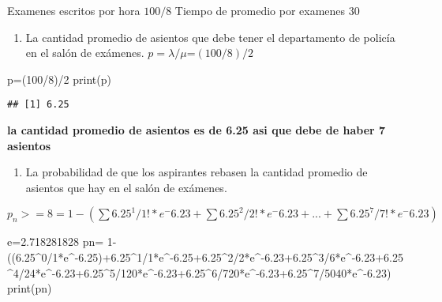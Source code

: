 \documentclass[
]{article}
\newenvironment{Shaded}{\begin{snugshade}}{\end{snugshade}}
\newcommand{\DecValTok}[1]{\textcolor[rgb]{0.00,0.00,0.81}{#1}}
\newcommand{\FloatTok}[1]{\textcolor[rgb]{0.00,0.00,0.81}{#1}}
\newcommand{\FunctionTok}[1]{\textcolor[rgb]{0.00,0.00,0.00}{#1}}
\newcommand{\NormalTok}[1]{#1}
\newcommand{\OtherTok}[1]{\textcolor[rgb]{0.56,0.35,0.01}{#1}}
\newcommand{\SpecialCharTok}[1]{\textcolor[rgb]{0.00,0.00,0.00}{#1}}
\providecommand{\tightlist}{%
  \setlength{\itemsep}{0pt}\setlength{\parskip}{0pt}}
\begin{document}
Examenes escritos por hora \(100/8\) Tiempo de promedio por examenes
\(30\)

\begin{enumerate}
\def\labelenumi{\alph{enumi})}
\tightlist
\item
  La cantidad promedio de asientos que debe tener el departamento de
  policía en el salón de exámenes. \(p=\lambda/\mu\)=\((100/8)/2\)
\end{enumerate}

\begin{Shaded}
\begin{Highlighting}[]
\NormalTok{p}\OtherTok{=}\NormalTok{(}\DecValTok{100}\SpecialCharTok{/}\DecValTok{8}\NormalTok{)}\SpecialCharTok{/}\DecValTok{2}
\FunctionTok{print}\NormalTok{(p)}
\end{Highlighting}
\end{Shaded}

\begin{verbatim}
## [1] 6.25
\end{verbatim}

\textbf{la cantidad promedio de asientos es de 6.25 asi que debe de
haber 7 asientos}

\begin{enumerate}
\def\labelenumi{\alph{enumi})}
\setcounter{enumi}{1}
\tightlist
\item
  La probabilidad de que los aspirantes rebasen la cantidad promedio de
  asientos que hay en el salón de exámenes.
\end{enumerate}

\(p_n>=8=1-(\sum6.25^1/1!*e^-6.23+\sum6.25^2/2!*e^-6.23+...+\sum6.25^7/7!*e^-6.23)\)

\begin{Shaded}
\begin{Highlighting}[]
\NormalTok{e}\OtherTok{=}\FloatTok{2.718281828}
\NormalTok{pn}\OtherTok{=} \DecValTok{1}\SpecialCharTok{{-}}\NormalTok{((}\FloatTok{6.25}\SpecialCharTok{\^{}}\DecValTok{0}\SpecialCharTok{/}\DecValTok{1}\SpecialCharTok{*}\NormalTok{e}\SpecialCharTok{\^{}{-}}\FloatTok{6.25}\NormalTok{)}\SpecialCharTok{+}\FloatTok{6.25}\SpecialCharTok{\^{}}\DecValTok{1}\SpecialCharTok{/}\DecValTok{1}\SpecialCharTok{*}\NormalTok{e}\SpecialCharTok{\^{}{-}}\FloatTok{6.25+6.25}\SpecialCharTok{\^{}}\DecValTok{2}\SpecialCharTok{/}\DecValTok{2}\SpecialCharTok{*}\NormalTok{e}\SpecialCharTok{\^{}{-}}\FloatTok{6.23+6.25}\SpecialCharTok{\^{}}\DecValTok{3}\SpecialCharTok{/}\DecValTok{6}\SpecialCharTok{*}\NormalTok{e}\SpecialCharTok{\^{}{-}}\FloatTok{6.23+6.25}\SpecialCharTok{\^{}}\DecValTok{4}\SpecialCharTok{/}\DecValTok{24}\SpecialCharTok{*}\NormalTok{e}\SpecialCharTok{\^{}{-}}\FloatTok{6.23+6.25}\SpecialCharTok{\^{}}\DecValTok{5}\SpecialCharTok{/}\DecValTok{120}\SpecialCharTok{*}\NormalTok{e}\SpecialCharTok{\^{}{-}}\FloatTok{6.23+6.25}\SpecialCharTok{\^{}}\DecValTok{6}\SpecialCharTok{/}\DecValTok{720}\SpecialCharTok{*}\NormalTok{e}\SpecialCharTok{\^{}{-}}\FloatTok{6.23+6.25}\SpecialCharTok{\^{}}\DecValTok{7}\SpecialCharTok{/}\DecValTok{5040}\SpecialCharTok{*}\NormalTok{e}\SpecialCharTok{\^{}{-}}\FloatTok{6.23}\NormalTok{)}
\FunctionTok{print}\NormalTok{(pn)}
\end{Highlighting}
\end{Shaded}
\end{document}
